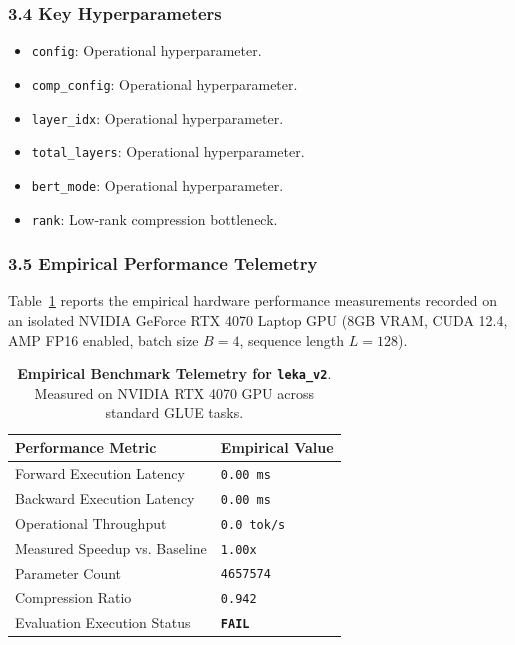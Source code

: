 \subsubsection*{3.4 Key Hyperparameters}
\begin{itemize}
    \item \texttt{config}: Operational hyperparameter.
    \item \texttt{comp\_config}: Operational hyperparameter.
    \item \texttt{layer\_idx}: Operational hyperparameter.
    \item \texttt{total\_layers}: Operational hyperparameter.
    \item \texttt{bert\_mode}: Operational hyperparameter.
    \item \texttt{rank}: Low-rank compression bottleneck.
\end{itemize}

\subsubsection*{3.5 Empirical Performance Telemetry}
Table~\ref{tab:telemetry_leka\_v2} reports the empirical hardware performance measurements recorded on an isolated NVIDIA GeForce RTX 4070 Laptop GPU (8GB VRAM, CUDA 12.4, AMP FP16 enabled, batch size $B=4$, sequence length $L=128$).

\begin{table}[h]
\centering
\small
\caption{\textbf{Empirical Benchmark Telemetry for \texttt{leka\_v2}}. Measured on NVIDIA RTX 4070 GPU across standard GLUE tasks.}
\label{tab:telemetry_leka\_v2}
\begin{tabularx}{\columnwidth}{lX}
\toprule
\textbf{Performance Metric} & \textbf{Empirical Value} \\
\midrule
Forward Execution Latency & \texttt{0.00 ms} \\
Backward Execution Latency & \texttt{0.00 ms} \\
Operational Throughput & \texttt{0.0 tok/s} \\
Measured Speedup vs. Baseline & \texttt{1.00x} \\
Parameter Count & \texttt{4657574} \\
Compression Ratio & \texttt{0.942} \\
Evaluation Execution Status & \textbf{\texttt{FAIL}} \\
\bottomrule
\end{tabularx}
\end{table}

